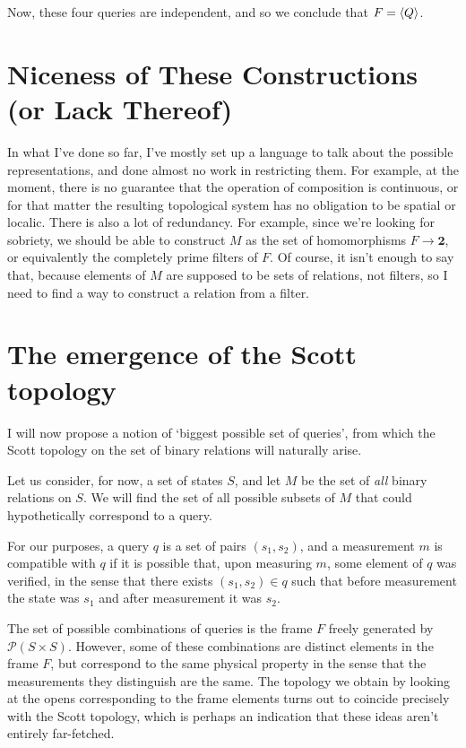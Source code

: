 \documentclass{article}
\theoremstyle{definition}
\theoremstyle{plain}
\newcommand{\ps}{\mathcal{P}}
\newcommand{\two}{\mathbf{2}}
\begin{document}
Now, these four queries are independent, and so we conclude that $F = \braket{Q}$.

\section{Niceness of These Constructions (or Lack Thereof)}

In what I've done so far, I've mostly set up a language to talk about the possible representations, and done almost no work in restricting them. For example, at the moment, there is no guarantee that the operation of composition is continuous, or for that matter the resulting topological system has no obligation to be spatial or localic. There is also a lot of redundancy. For example, since we're looking for sobriety, we should be able to construct $M$ as the set of homomorphisms $F \to \two$, or equivalently the completely prime filters of $F$. Of course, it isn't enough to say that, because elements of $M$ are supposed to be sets of relations, not filters, so I need to find a way to construct a relation from a filter.

\section{The emergence of the Scott topology}

I will now propose a notion of `biggest possible set of queries', from which the Scott topology on the set of binary relations will naturally arise.

Let us consider, for now, a set of states $S$, and let $M$ be the set of \emph{all} binary relations on $S$. We will find the set of all possible subsets of $M$ that could hypothetically correspond to a query.

For our purposes, a query $q$ is a set of pairs $(s_1, s_2)$, and a measurement $m$ is compatible with $q$ if it is possible that, upon measuring $m$, some element of $q$ was verified, in the sense that there exists $(s_1, s_2) \in q$ such that before measurement the state was $s_1$ and after measurement it was $s_2$.

The set of possible combinations of queries is the frame $F$ freely generated by $\ps(S \times S)$. However, some of these combinations are distinct elements in the frame $F$, but correspond to the same physical property in the sense that the measurements they distinguish are the same. The topology we obtain by looking at the opens corresponding to the frame elements turns out to coincide precisely with the Scott topology, which is perhaps an indication that these ideas aren't entirely far-fetched.
\end{document}
